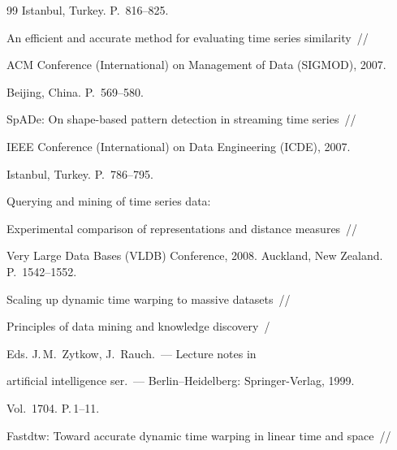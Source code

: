 {{\begin{thebibliography}{99}
Istanbul, Turkey. P.~816--825.



An efficient and accurate method for evaluating time series similarity~/\!\!/ 

ACM  Conference (International) on Management of Data (SIGMOD), 2007. 

Beijing, China. P.~569--580.



   SpADe: On shape-based pattern detection in streaming time series~/\!\!/ 

   IEEE  Conference (International) on Data Engineering (ICDE), 2007. 

   Istanbul, Turkey. P.~786--795.



Querying and mining of time series data: 

Experimental comparison of representations and distance measures~/\!\!/ 

Very Large Data Bases (VLDB) Conference, 2008. Auckland, New Zealand. P.~1542--1552.






    Scaling up dynamic time warping to massive datasets~/\!\!/ 

   Principles of data mining and knowledge discovery~/

   Eds. J.\,M.~Zytkow, J.~Rauch.~--- Lecture notes in

   artificial intelligence ser.~--- Berlin--Heidelberg: Springer-Verlag, 1999. 

   Vol.~1704. P.\,1--11. 






     Fastdtw: Toward accurate dynamic time warping in linear time and space~/\!\!/ 


\end{thebibliography}}}
